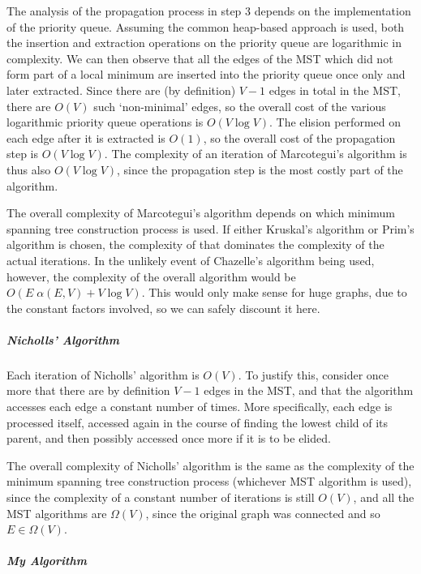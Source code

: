 The analysis of the propagation process in step 3 depends on the implementation of the priority queue. Assuming the common heap-based approach \cite{clr-pq} is used, both the insertion and extraction operations on the priority queue are logarithmic in complexity. We can then observe that all the edges of the MST which did not form part of a local minimum are inserted into the priority queue once only and later extracted. Since there are (by definition) $V - 1$ edges in total in the MST, there are $O(V)$ such `non-minimal' edges, so the overall cost of the various logarithmic priority queue operations is $O(V \log V)$. The elision performed on each edge after it is extracted is $O(1)$, so the overall cost of the propagation step is $O(V \log V)$. The complexity of an iteration of Marcotegui's algorithm is thus also $O(V \log V)$, since the propagation step is the most costly part of the algorithm.

The overall complexity of Marcotegui's algorithm depends on which minimum spanning tree construction process is used. If either Kruskal's algorithm or Prim's algorithm is chosen, the complexity of that dominates the complexity of the actual iterations. In the unlikely event of Chazelle's algorithm being used, however, the complexity of the overall algorithm would be $O(E \; \alpha(E,V) + V \log V)$. This would only make sense for huge graphs, due to the constant factors involved, so we can safely discount it here.

\subparagraph{Nicholls' Algorithm}

Each iteration of Nicholls' algorithm is $O(V)$. To justify this, consider once more that there are by definition $V - 1$ edges in the MST, and that the algorithm accesses each edge a constant number of times. More specifically, each edge is processed itself, accessed again in the course of finding the lowest child of its parent, and then possibly accessed once more if it is to be elided.

The overall complexity of Nicholls' algorithm is the same as the complexity of the minimum spanning tree construction process (whichever MST algorithm is used), since the complexity of a constant number of iterations is still $O(V)$, and all the MST algorithms are $\Omega(V)$, since the original graph was connected and so $E \in \Omega(V)$.

\subparagraph{My Algorithm}

